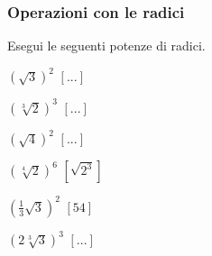 
\subsubsection*{Operazioni con le radici}

\begin{esercizio}[\Ast]
 \label{ese:2.46}
Esegui le seguenti potenze di radici.
 \begin{multicols}{3}
 \begin{enumeratea}
 \item $\left(\sqrt 3\right)^2$
  \hfill $\left[...\right]$
 \item $\left(\sqrt[3]2\right)^3$
  \hfill $\left[...\right]$
 \item $\left(\sqrt 4\right)^2$
  \hfill $\left[...\right]$
 \item $\left(\sqrt[4]2\right)^6$
  \hfill $\left[\sqrt{2^3}\right]$
 \item $\left(\frac 1 3\sqrt 3\right)^2$
  \hfill $\left[54\right]$
 \item $\left(2\sqrt[3]3\right)^3$
  \hfill $\left[...\right]$

\end{enumeratea}
\end{multicols}
\end{esercizio}
